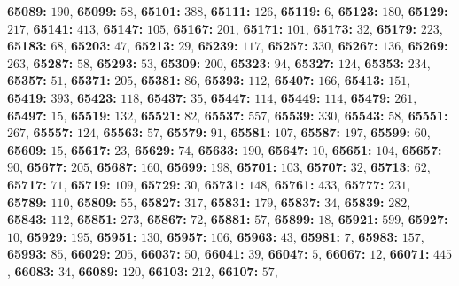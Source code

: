 \textsf{\bfseries 65089:} $190$, \textsf{\bfseries 65099:} $58$, \textsf{\bfseries 65101:} $388$, \textsf{\bfseries 65111:} $126$, \textsf{\bfseries 65119:} $6$, \textsf{\bfseries 65123:} $180$, \textsf{\bfseries 65129:} $217$, \textsf{\bfseries 65141:} $413$, \textsf{\bfseries 65147:} $105$, \textsf{\bfseries 65167:} $201$, \textsf{\bfseries 65171:} $101$, \textsf{\bfseries 65173:} $32$, \textsf{\bfseries 65179:} $223$, \textsf{\bfseries 65183:} $68$, \textsf{\bfseries 65203:} $47$, \textsf{\bfseries 65213:} $29$, \textsf{\bfseries 65239:} $117$, \textsf{\bfseries 65257:} $330$, \textsf{\bfseries 65267:} $136$, \textsf{\bfseries 65269:} $263$, \textsf{\bfseries 65287:} $58$, \textsf{\bfseries 65293:} $53$, \textsf{\bfseries 65309:} $200$, \textsf{\bfseries 65323:} $94$, \textsf{\bfseries 65327:} $124$, \textsf{\bfseries 65353:} $234$, \textsf{\bfseries 65357:} $51$, \textsf{\bfseries 65371:} $205$, \textsf{\bfseries 65381:} $86$, \textsf{\bfseries 65393:} $112$, \textsf{\bfseries 65407:} $166$, \textsf{\bfseries 65413:} $151$, \textsf{\bfseries 65419:} $393$, \textsf{\bfseries 65423:} $118$, \textsf{\bfseries 65437:} $35$, \textsf{\bfseries 65447:} $114$, \textsf{\bfseries 65449:} $114$, \textsf{\bfseries 65479:} $261$, \textsf{\bfseries 65497:} $15$, \textsf{\bfseries 65519:} $132$, \textsf{\bfseries 65521:} $82$, \textsf{\bfseries 65537:} $557$, \textsf{\bfseries 65539:} $330$, \textsf{\bfseries 65543:} $58$, \textsf{\bfseries 65551:} $267$, \textsf{\bfseries 65557:} $124$, \textsf{\bfseries 65563:} $57$, \textsf{\bfseries 65579:} $91$, \textsf{\bfseries 65581:} $107$, \textsf{\bfseries 65587:} $197$, \textsf{\bfseries 65599:} $60$, \textsf{\bfseries 65609:} $15$, \textsf{\bfseries 65617:} $23$, \textsf{\bfseries 65629:} $74$, \textsf{\bfseries 65633:} $190$, \textsf{\bfseries 65647:} $10$, \textsf{\bfseries 65651:} $104$, \textsf{\bfseries 65657:} $90$, \textsf{\bfseries 65677:} $205$, \textsf{\bfseries 65687:} $160$, \textsf{\bfseries 65699:} $198$, \textsf{\bfseries 65701:} $103$, \textsf{\bfseries 65707:} $32$, \textsf{\bfseries 65713:} $62$, \textsf{\bfseries 65717:} $71$, \textsf{\bfseries 65719:} $109$, \textsf{\bfseries 65729:} $30$, \textsf{\bfseries 65731:} $148$, \textsf{\bfseries 65761:} $433$, \textsf{\bfseries 65777:} $231$, \textsf{\bfseries 65789:} $110$, \textsf{\bfseries 65809:} $55$, \textsf{\bfseries 65827:} $317$, \textsf{\bfseries 65831:} $179$, \textsf{\bfseries 65837:} $34$, \textsf{\bfseries 65839:} $282$, \textsf{\bfseries 65843:} $112$, \textsf{\bfseries 65851:} $273$, \textsf{\bfseries 65867:} $72$, \textsf{\bfseries 65881:} $57$, \textsf{\bfseries 65899:} $18$, \textsf{\bfseries 65921:} $599$, \textsf{\bfseries 65927:} $10$, \textsf{\bfseries 65929:} $195$, \textsf{\bfseries 65951:} $130$, \textsf{\bfseries 65957:} $106$, \textsf{\bfseries 65963:} $43$, \textsf{\bfseries 65981:} $7$, \textsf{\bfseries 65983:} $157$, \textsf{\bfseries 65993:} $85$, \textsf{\bfseries 66029:} $205$, \textsf{\bfseries 66037:} $50$, \textsf{\bfseries 66041:} $39$, \textsf{\bfseries 66047:} $5$, \textsf{\bfseries 66067:} $12$, \textsf{\bfseries 66071:} $445$, \textsf{\bfseries 66083:} $34$, \textsf{\bfseries 66089:} $120$, \textsf{\bfseries 66103:} $212$, \textsf{\bfseries 66107:} $57$, 
